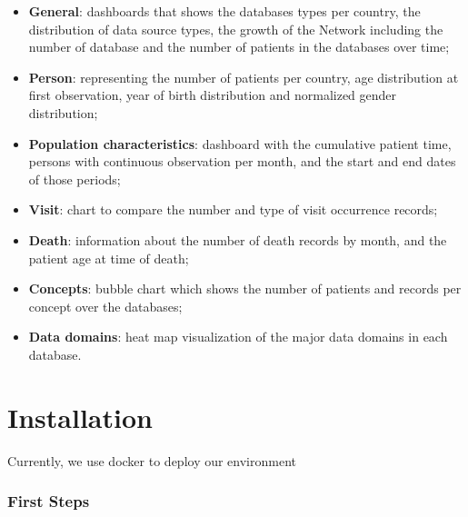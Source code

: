 \documentclass[
]{book}
\providecommand{\tightlist}{%
  \setlength{\itemsep}{0pt}\setlength{\parskip}{0pt}}
\begin{document}
\begin{itemize}
\tightlist
\item
  \textbf{General}: dashboards that shows the databases types per country, the distribution of data source types, the growth of the Network including the number of database and the number of patients in the databases over time;
\item
  \textbf{Person}: representing the number of patients per country, age distribution at first observation, year of birth distribution and normalized gender distribution;
\item
  \textbf{Population characteristics}: dashboard with the cumulative patient time, persons with continuous observation per month, and the start and end dates of those periods;
\item
  \textbf{Visit}: chart to compare the number and type of visit occurrence records;
\item
  \textbf{Death}: information about the number of death records by month, and the patient age at time of death;
\item
  \textbf{Concepts}: bubble chart which shows the number of patients and records per concept over the databases;
\item
  \textbf{Data domains}: heat map visualization of the major data domains in each database.
\end{itemize}

\hypertarget{installation}{%
\chapter{Installation}\label{installation}}

Currently, we use docker to deploy our environment

\hypertarget{first-steps}{%
\subsection*{First Steps}\label{first-steps}}
\end{document}
